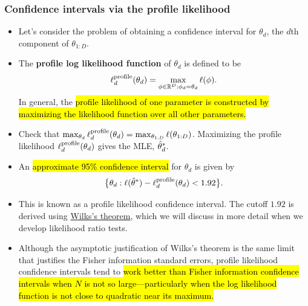 \documentclass[]{article}
\begin{document}
\subsubsection{Confidence intervals via the profile
likelihood}\label{confidence-intervals-via-the-profile-likelihood}

\begin{itemize}
\item
  Let's consider the problem of obtaining a confidence interval for
  \(\theta_d\), the \(d\)th component of \(\theta_{1:D}\).
\item
  The \textbf{profile log likelihood function} of \(\theta_d\) is
  defined to be
  \[ \ell^\mathrm{profile}_d(\theta_d) = \max_{\phi\in\mathbb{R}^D: \phi_d=\theta_d}\ell(\phi).\]
  In general, the \hl{profile likelihood of one parameter is constructed by
  maximizing the likelihood function over all other parameters.}
\item
  Check that
  \(\max_{\theta_d}\ell^\mathrm{profile}_d(\theta_d) = \max_{\theta_{1:D}}\ell(\theta_{1:D})\).
  Maximizing the profile likelihood \(\ell^\mathrm{profile}_d(\theta_d)\)
  gives the MLE, \(\hat\theta_d^*\).
\item
  An \hl{approximate 95\% confidence interval} for \(\theta_d\) is given by
  \[ \big\{\theta_d : \ell(\hat\theta^*) - \ell^\mathrm{profile}_d(\theta_d)< 1.92\big\}.\]
  
\item
  This is known as a profile likelihood confidence interval. The cutoff
  \(1.92\) is derived using
  \href{https://en.wikipedia.org/wiki/Likelihood-ratio_test\#Distribution:_Wilks.27s_theorem}{Wilks's
  theorem}, which we will discuss in more detail when we develop
  likelihood ratio tests.
\item
  Although the asymptotic justification of Wilks's theorem is the same
  limit that justifies the Fisher information standard errors, profile
  likelihood confidence intervals tend to \hl{work better than Fisher
  information confidence intervals when $N$ is not so
  large---particularly when the log likelihood function is not close to
  quadratic near its maximum.}
\end{itemize}
\end{document}
